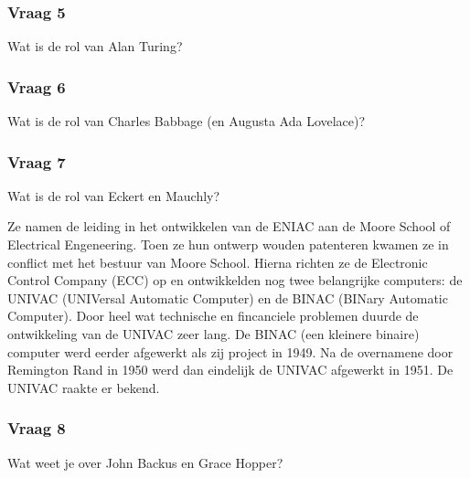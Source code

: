 \documentclass[../main.tex]{subfiles}
\begin{document}
\subsubsection{Vraag 5}
\begin{question}
Wat is de rol van Alan Turing?
\end{question}

\subsubsection{Vraag 6}
\begin{question}
Wat is de rol van Charles Babbage (en Augusta Ada Lovelace)?
\end{question}

\subsubsection{Vraag 7}
\begin{question}
Wat is de rol van Eckert en Mauchly?
\end{question}
\begin{solution}
Ze namen de leiding in het ontwikkelen van de ENIAC aan de Moore School of Electrical Engeneering.
Toen ze hun ontwerp wouden patenteren kwamen ze in conflict met het bestuur van Moore School.
Hierna richten ze de Electronic Control Company (ECC) op en ontwikkelden nog twee belangrijke computers: de UNIVAC (UNIVersal Automatic Computer) en de BINAC (BINary Automatic Computer).
Door heel wat technische en fincanciele problemen duurde de ontwikkeling van de UNIVAC zeer lang. 
De BINAC (een kleinere binaire) computer werd eerder afgewerkt als zij project in 1949.
Na de overnamene door Remington Rand in 1950 werd dan eindelijk de UNIVAC afgewerkt in 1951. 
De UNIVAC raakte er bekend.
\end{solution}
\subsubsection{Vraag 8}
\begin{question}
Wat weet je over John Backus en Grace Hopper?
\end{question}
\end{document}
